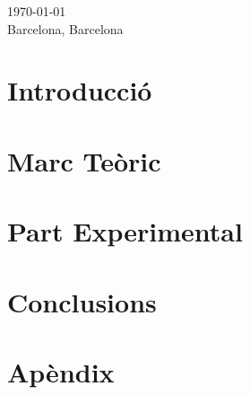 \documentclass[a4paper,12pt,arial,numbered,print,index,oneside]{book}
\newcommand\blankpage{%
	\null
	\thispagestyle{empty}%
	\addtocounter{page}{-1}%
	\newpage}
\let\LaTeXStandardTableOfContents\tableofcontents
\renewcommand{\tableofcontents}{%
	\begingroup%
	\renewcommand{\bfseries}{\relax}%
	\LaTeXStandardTableOfContents%
	\endgroup%
}%
\begin{document}
\begin{titlepage}
		
		\vspace{.4cm}
		
		
		{\large \today} \\
		\large Barcelona, Barcelona  
		
		
		\vfill %
		
	\end{titlepage}

	
	\onehalfspacing
	\setlength{\parskip}{0.5cm plus4mm minus3mm}
	\afterpage{\blankpage}
	
	\tableofcontents
	
	\clearpage
	
	\thispagestyle{plain}
	
	\part*{Introducció}
	\label{part:intro}
	
	
	\part{Marc Teòric}
	\label{part:theoretical_framework}
	
	
	\part{Part Experimental}
	\label{part:experimental_work}
	
	
	\part{Conclusions}
	\label{part:conclusions}
	
	
	\printglossaries
	
	\part{Apèndix}
	\begin{appendices}
		
	\end{appendices}

	
	
	
\end{document}
